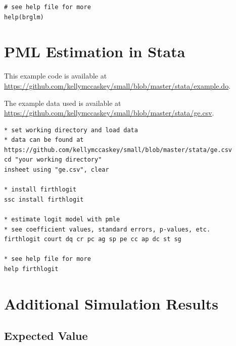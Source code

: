 \documentclass[12pt]{article}
\begin{document}
\begin{appendix}
\begin{footnotesize}
\begin{verbatim}
# see help file for more
help(brglm)
\end{verbatim}
\end{footnotesize}

\section{PML Estimation in Stata}\label{sec:pmle-in-stata}

This example code is available at \href{https://github.com/kellymccaskey/small/blob/master/stata/example.do}{https://github.com/kellymccaskey/small/blob/master/stata/example.do}.

\noindent The example data used is available at \href{https://github.com/kellymccaskey/small/blob/master/stata/GE.dta}{https://github.com/kellymccaskey/small/blob/master/stata/ge.csv}.


\begin{footnotesize}
\begin{verbatim}
* set working directory and load data
* data can be found at https://github.com/kellymccaskey/small/blob/master/stata/ge.csv
cd "your working directory"
insheet using "ge.csv", clear

* install firthlogit
ssc install firthlogit

* estimate logit model with pmle
* see coefficient values, standard errors, p-values, etc.
firthlogit court dq cr pc ag sp pe cc ap dc st sg

* see help file for more
help firthlogit

\end{verbatim}
\end{footnotesize}


\section{Additional Simulation Results}\label{sec:app-sims}

\subsection{Expected Value}


\end{appendix}
\end{document}
